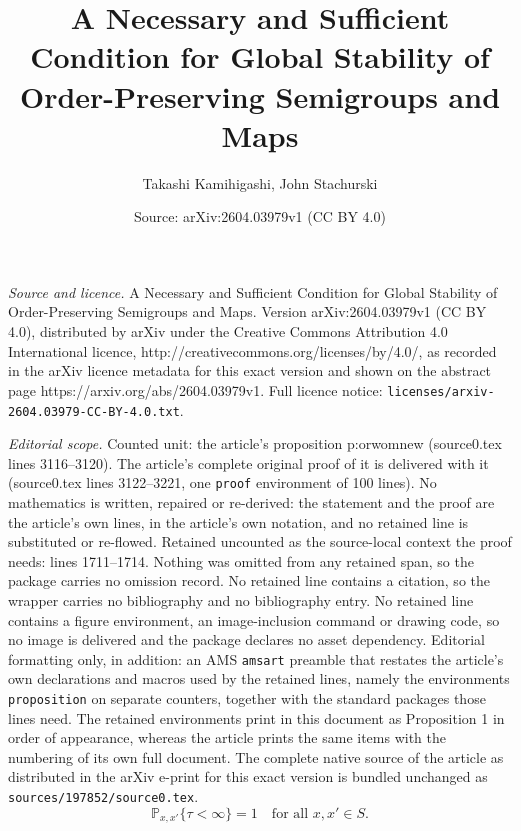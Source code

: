 \documentclass[10pt,a4paper]{amsart}
\title{A Necessary and Sufficient Condition for Global Stability of Order-Preserving Semigroups and Maps}
\author{Takashi Kamihigashi, John Stachurski}
\date{Source: arXiv:2604.03979v1 (CC BY 4.0)}
\newcommand{\PP}{\mathbb P}
\begin{document}
\maketitle

\noindent\emph{Source and licence.} A Necessary and Sufficient Condition for Global Stability of Order-Preserving Semigroups and Maps. Version arXiv:2604.03979v1 (CC BY 4.0), distributed by arXiv under the Creative Commons Attribution 4.0 International licence, http://creativecommons.org/licenses/by/4.0/, as recorded in the arXiv licence metadata for this exact version and shown on the abstract page https://arxiv.org/abs/2604.03979v1. Full licence notice: \texttt{licenses/arxiv-2604.03979-CC-BY-4.0.txt}.\par\smallskip

\noindent\textit{Editorial scope.} Counted unit: the article's proposition p:orwomnew (source0.tex lines 3116--3120). The article's complete original proof of it is delivered with it (source0.tex lines 3122--3221, one \texttt{proof} environment of 100 lines). No mathematics is written, repaired or re-derived: the statement and the proof are the article's own lines, in the article's own notation, and no retained line is substituted or re-flowed.  Retained uncounted as the source-local context the proof needs: lines 1711--1714.  Nothing was omitted from any retained span, so the package carries no omission record.  No retained line contains a citation, so the wrapper carries no bibliography and no bibliography entry.  No retained line contains a figure environment, an image-inclusion command or drawing code, so no image is delivered and the package declares no asset dependency.  Editorial formatting only, in addition: an AMS \texttt{amsart} preamble that restates the article's own declarations and macros used by the retained lines, namely the environments \texttt{proposition} on separate counters, together with the standard packages those lines need.  The retained environments print in this document as Proposition 1 in order of appearance, whereas the article prints the same items with the numbering of its own full document.  The complete native source of the article as distributed in the arXiv e-print for this exact version is bundled unchanged as \texttt{sources/197852/source0.tex}.
        \begin{equation}\label{eq:omb}
            \PP_{x,x'} \{ \tau < \infty\} = 1
            \quad \text{for all } x, x' \in S.
        \end{equation}
\end{document}
